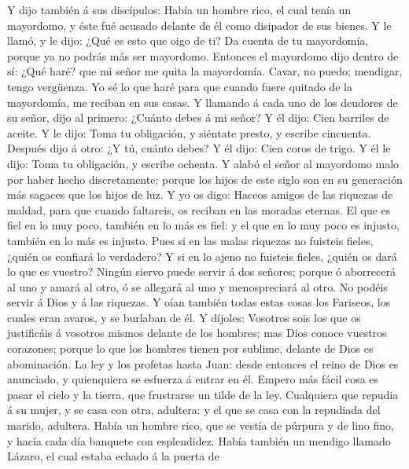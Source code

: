  Y dijo también á sus discípulos: Había un hombre rico, el
cual tenía un mayordomo, y éste fué acusado delante de él como disipador
de sus bienes.  Y le llamó, y le dijo: ¿Qué es esto que
oigo de ti? Da cuenta de tu mayordomía, porque ya no podrás más ser
mayordomo.  Entonces el mayordomo dijo dentro de sí: ¿Qué
haré? que mi señor me quita la mayordomía. Cavar, no puedo; mendigar,
tengo vergüenza.  Yo sé lo que haré para que cuando fuere
quitado de la mayordomía, me reciban en sus casas.  Y
llamando á cada uno de los deudores de su señor, dijo al primero:
¿Cuánto debes á mi señor?  Y él dijo: Cien barriles de
aceite. Y le dijo: Toma tu obligación, y siéntate presto, y escribe
cincuenta.  Después dijo á otro: ¿Y tú, cuánto debes? Y él
dijo: Cien coros de trigo. Y él le dijo: Toma tu obligación, y escribe
ochenta.  Y alabó el señor al mayordomo malo por haber
hecho discretamente; porque los hijos de este siglo son en su generación
más sagaces que los hijos de luz.  Y yo os digo: Haceos
amigos de las riquezas de maldad, para que cuando faltareis, os reciban
en las moradas eternas.  El que es fiel en lo muy poco,
también en lo más es fiel: y el que en lo muy poco es injusto, también
en lo más es injusto.  Pues si en las malas riquezas no
fuisteis fieles, ¿quién os confiará lo verdadero?  Y si
en lo ajeno no fuisteis fieles, ¿quién os dará lo que es vuestro?
 Ningún siervo puede servir á dos señores; porque ó
aborrecerá al uno y amará al otro, ó se allegará al uno y menospreciará
al otro. No podéis servir á Dios y á las riquezas.  Y
oían también todas estas cosas los Fariseos, los cuales eran avaros, y
se burlaban de él.  Y díjoles: Vosotros sois los que os
justificáis á vosotros mismos delante de los hombres; mas Dios conoce
vuestros corazones; porque lo que los hombres tienen por sublime,
delante de Dios es abominación.  La ley y los profetas
hasta Juan: desde entonces el reino de Dios es anunciado, y quienquiera
se esfuerza á entrar en él.  Empero más fácil cosa es
pasar el cielo y la tierra, que frustrarse un tilde de la ley.
 Cualquiera que repudia á su mujer, y se casa con otra,
adultera: y el que se casa con la repudiada del marido, adultera.
 Había un hombre rico, que se vestía de púrpura y de lino
fino, y hacía cada día banquete con esplendidez.  Había
también un mendigo llamado Lázaro, el cual estaba echado á la puerta de
